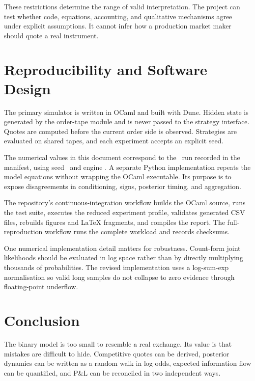 \documentclass[11pt]{article}
\begin{document}
These restrictions determine the range of valid interpretation. The project can test whether code, equations, accounting, and qualitative mechanisms agree under explicit assumptions. It cannot infer how a production market maker should quote a real instrument.

\section{Reproducibility and Software Design}

The primary simulator is written in OCaml and built with Dune. Hidden state is generated by the order-tape module and is never passed to the strategy interface. Quotes are computed before the current order side is observed. Strategies are evaluated on shared tapes, and each experiment accepts an explicit seed.

The numerical values in this document correspond to the \ResultsProfile\ run recorded in the manifest, using seed \ResultsSeed\ and engine \texttt{\ResultsEngine}. A separate Python implementation repeats the model equations without wrapping the OCaml executable. Its purpose is to expose disagreements in conditioning, signs, posterior timing, and aggregation.

The repository's continuous-integration workflow builds the OCaml source, runs the test suite, executes the reduced experiment profile, validates generated CSV files, rebuilds figures and LaTeX fragments, and compiles the report. The full-reproduction workflow runs the complete workload and records checksums.

One numerical implementation detail matters for robustness. Count-form joint likelihoods should be evaluated in log space rather than by directly multiplying thousands of probabilities. The revised implementation uses a log-sum-exp normalisation so valid long samples do not collapse to zero evidence through floating-point underflow.

\section{Conclusion}

The binary model is too small to resemble a real exchange. Its value is that mistakes are difficult to hide. Competitive quotes can be derived, posterior dynamics can be written as a random walk in log odds, expected information flow can be quantified, and P\&L can be reconciled in two independent ways.
\end{document}
